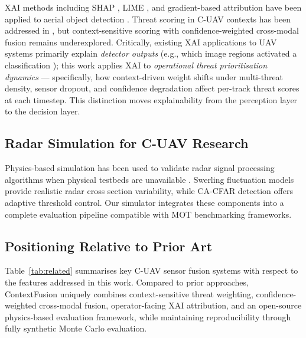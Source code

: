 \documentclass[drones,article,submit,pdftex]{Definitions/mdpi}
\begin{document}
XAI methods including SHAP \cite{ref_shap}, LIME \cite{ref_lime}, and
gradient-based attribution \cite{ref_gradcam} have been applied to aerial
object detection \cite{ref_xai_uav,ref_xai_defense}.
Threat scoring in C-UAV contexts has been addressed in
\cite{ref_threat_score_cuav}, but context-sensitive scoring with
confidence-weighted cross-modal fusion remains underexplored.
Critically, existing XAI applications to UAV systems primarily explain
\emph{detector outputs} (e.g., which image regions activated a classification
\cite{ref_xai_uav}); this work applies XAI to \emph{operational threat
prioritisation dynamics} --- specifically, how context-driven weight shifts
under multi-threat density, sensor dropout, and confidence degradation affect
per-track threat scores at each timestep.
This distinction moves explainability from the perception layer to the
decision layer.

\subsection{Radar Simulation for C-UAV Research}

Physics-based simulation has been used to validate radar signal processing
algorithms when physical testbeds are unavailable
\cite{ref_radar_sim_validation,ref_synthetic_radar_dataset}.
Swerling fluctuation models \cite{ref_skolnik} provide realistic radar cross
section variability, while CA-CFAR detection \cite{ref_cfar_review} offers
adaptive threshold control.
Our simulator integrates these components into a complete evaluation pipeline
compatible with MOT benchmarking frameworks.

\subsection{Positioning Relative to Prior Art}

Table~\ref{tab:related} summarises key C-UAV sensor fusion systems with respect
to the features addressed in this work.
Compared to prior approaches, ContextFusion uniquely combines context-sensitive
threat weighting, confidence-weighted cross-modal fusion, operator-facing XAI
attribution, and an open-source physics-based evaluation framework, while
maintaining reproducibility through fully synthetic Monte Carlo evaluation.
\end{document}
